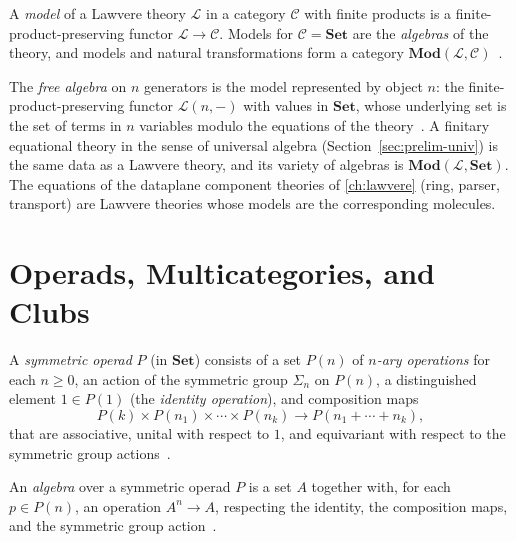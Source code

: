 \begin{definition}
A \emph{model} of a Lawvere theory $\mathcal{L}$ in a category $\mathcal{C}$
with finite products is a finite-product-preserving functor
$\mathcal{L} \to \mathcal{C}$. Models for $\mathcal{C} = \mathbf{Set}$ are
the \emph{algebras} of the theory, and models and natural transformations
form a category $\mathbf{Mod} (\mathcal{L}, \mathcal{C})$~\cite{lawvere,
arxiv-lawvere}.
\end{definition}

\begin{remark}
The \emph{free algebra} on $n$ generators is the model represented by object
$n$: the finite-product-preserving functor $\mathcal{L} (n,-)$ with values in
$\mathbf{Set}$, whose underlying set is the set of terms in $n$ variables
modulo the equations of the theory~\cite{lawvere}. A finitary equational
theory in the sense of universal algebra (Section~\ref{sec:prelim-univ}) is
the same data as a Lawvere theory, and its variety of algebras is
$\mathbf{Mod} (\mathcal{L}, \mathbf{Set})$. The equations of the dataplane
component theories of \autoref{ch:lawvere} (ring, parser, transport) are
Lawvere theories whose models are the corresponding molecules.
\end{remark}

\section{Operads, Multicategories, and Clubs}\label{sec:prelim-operads}

\begin{definition}
A \emph{symmetric operad} $P$ (in $\mathbf{Set}$) consists of a set $P (n)$
of \emph{$n$-ary operations} for each $n \geq 0$, an action of the symmetric
group $\Sigma_n$ on $P (n)$, a distinguished element $1 \in P (1)$ (the
\emph{identity operation}), and composition maps
\[ P (k) \times P (n_1) \times \cdots \times P (n_k)
   \to P (n_1 + \cdots + n_k), \]
that are associative, unital with respect to $1$, and equivariant with
respect to the symmetric group actions~\cite{leinster, arxiv-operads}.
\end{definition}

\begin{definition}
An \emph{algebra} over a symmetric operad $P$ is a set $A$ together with, for
each $p \in P (n)$, an operation $A^n \to A$, respecting the identity, the
composition maps, and the symmetric group action~\cite{leinster,
arxiv-operads}.
\end{definition}

